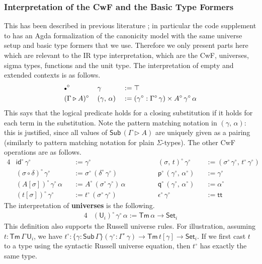 \documentclass[acmsmall,screen,review,anonymous]{acmart}
\newcommand{\msf}[1]{{\mathsf{#1}}}
\newcommand{\mbb}[1]{\mathbb{#1}}
\newcommand{\p}{\mathsf{p}}
\newcommand{\q}{\mathsf{q}}
\newcommand{\U}{\msf{U}}
\newcommand{\Set}{\msf{Set}}
\newcommand{\ttt}{\msf{tt}}
\newcommand{\emptycon}{\scaleobj{.75}\bullet}
\newcommand{\id}{\msf{id}}
\newcommand{\Sub}{\msf{Sub}}
\newcommand{\Tm}{\msf{Tm}}
\newcommand{\ext}{\triangleright}
\newcommand{\w}{\circ}
\newcommand{\G}{\mbb{G}}
\begin{document}

\subsubsection{Interpretation of the CwF and the Basic Type Formers}

This has been described in previous literature \cite{TODO}; in particular the code supplement to
\cite{TODO} has an Agda formalization of the canonicity model with the same universe setup and basic
type formers that we use. Therefore we only present parts here which are relevant to the IR type
interpretation, which are the CwF, universes, sigma types, functions and the unit type. The
interpretation of empty and extended contexts is as follows.
\begin{alignat*}{3}
  &\emptycon^\w\,&&\gamma                 &&:= \top \\
  &(\Gamma\ext A)^\w\,&&(\gamma,\,\alpha) &&:= (\gamma^\w : \Gamma^\w\,\gamma) \times A^\w\,\gamma^\w\,\alpha
\end{alignat*}
This says that the logical predicate holds for a closing substitution if it holds for each term in
the substitution. Note the pattern matching notation in $(\gamma,\,\alpha)$: this is justified,
since all values of $\Sub\,(\Gamma\ext A)$ are uniquely given as a pairing (similarly to pattern
matching notation for plain $\Sigma$-types). The other CwF operations are as follows.
\begin{alignat*}{4}
  &\id^\w\,\gamma^\w                   &&:= \gamma^\w                  &&(\sigma,\,t)^\w\,\gamma^\w          &&:= (\sigma^\w\,\gamma^\w,\,t^\w\,\gamma^\w)\\
  &(\sigma \circ \delta)^\w\,\gamma^\w &&:= \sigma^\w\,(\delta^\w\,\gamma^\w) && \p^\w\,(\gamma^\w,\,\alpha^\w)      &&:= \gamma^\w\\
  &(A[\sigma]) ^\w\,\gamma^\w\,\alpha  &&:= A^\w\,(\sigma^\w\,\gamma^\w)\,\alpha\hspace{3em} && \q^\w\,(\gamma^\w,\,\alpha^\w)      &&:= \alpha^\w\\
  &(t[\sigma]) ^\w\,\gamma^\w          &&:= t^\w\,(\sigma^\w\,\gamma^\w) && \epsilon^\w\,\gamma^\w              &&:= \ttt
\end{alignat*}
The interpretation of \textbf{universes} is the following.
\begin{alignat*}{4}
  &(\U_i)^\w\,\gamma^\w\,\alpha := \Tm\,\alpha \to \Set_i
\end{alignat*}
This definition also supports the Russell universe rules. For illustration, assuming $t :
\Tm\,\Gamma\,\U_i$, we have $t^\w : \{\gamma : \Sub\,\Gamma\}(\gamma^\w : \Gamma^\w\,\gamma) \to
\Tm\,t[\gamma] \to \Set_i$. If we first cast $t$ to a type using the syntactic Russell
universe equation, then $t^\w$ has exactly the same type.
\end{document}

